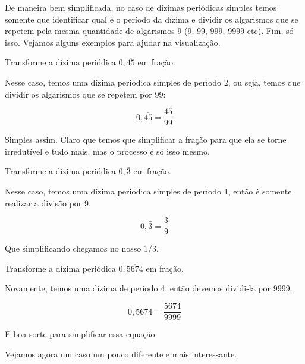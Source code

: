 De maneira bem simplificada, no caso de dízimas periódicas simples temos somente que identificar qual é o período da dízima e dividir os algarismos que se repetem pela mesma quantidade de algarismos 9 (9, 99, 999, 9999 etc). Fim, só isso. Vejamos alguns exemplos para ajudar na visualização.

\begin{exemplo}
    Transforme a dízima periódica \(0,\overline{45}\) em fração.

    \vspace{0.5cm}

    Nesse caso, temos uma dízima periódica simples de período 2, ou seja, temos que dividir os algarismos que se repetem por 99:

    \begin{equation}
        0,\overline{45}=\frac{45}{99}
    \end{equation}

    Simples assim. Claro que temos que simplificar a fração para que ela se torne irredutível e tudo mais, mas o processo é só isso mesmo.
\end{exemplo}

\begin{exemplo}
    Transforme a dízima periódica \(0,\bar{3}\) em fração.

    \vspace{0.5cm}

    Nesse caso, temos uma dízima periódica simples de período 1, então é somente realizar a divisão por 9.
    
    \begin{equation}
        0,\bar{3}=\frac{3}{9}
    \end{equation}

    Que simplificando chegamos no nosso 1/3.
\end{exemplo}

\begin{exemplo}
    Transforme a dízima periódica \(0,\overline{5674}\) em fração.

    Novamente, temos uma dízima de período 4, então devemos dividi-la por 9999.

    \begin{equation}
        0,\overline{5674}=\frac{5674}{9999}
    \end{equation}

    E boa sorte para simplificar essa equação.
\end{exemplo}

Vejamos agora um caso um pouco diferente e mais interessante.

